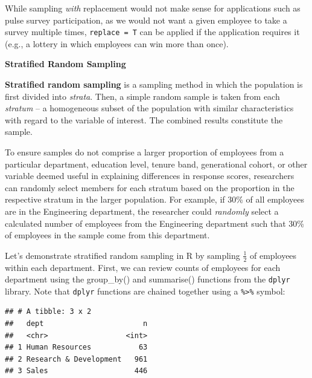 \documentclass[]{book}
\newenvironment{Shaded}{\begin{snugshade}}{\end{snugshade}}
\newcommand{\CommentTok}[1]{\textcolor[rgb]{0.56,0.35,0.01}{\textit{#1}}}
\newcommand{\DataTypeTok}[1]{\textcolor[rgb]{0.13,0.29,0.53}{#1}}
\newcommand{\KeywordTok}[1]{\textcolor[rgb]{0.13,0.29,0.53}{\textbf{#1}}}
\newcommand{\NormalTok}[1]{#1}
\newcommand{\OperatorTok}[1]{\textcolor[rgb]{0.81,0.36,0.00}{\textbf{#1}}}
\begin{document}
While sampling \emph{with} replacement would not make sense for applications such as pulse survey participation, as we would not want a given employee to take a survey multiple times, \texttt{replace\ =\ T} can be applied if the application requires it (e.g., a lottery in which employees can win more than once).

\textbf{Stratified Random Sampling}

\textbf{Stratified random sampling} is a sampling method in which the population is first divided into \emph{strata}. Then, a simple random sample is taken from each \emph{stratum} -- a homogeneous subset of the population with similar characteristics with regard to the variable of interest. The combined results constitute the sample.

To ensure samples do not comprise a larger proportion of employees from a particular department, education level, tenure band, generational cohort, or other variable deemed useful in explaining differences in response scores, researchers can randomly select members for each stratum based on the proportion in the respective stratum in the larger population. For example, if 30\% of all employees are in the Engineering department, the researcher could \emph{randomly} select a calculated number of employees from the Engineering department such that 30\% of employees in the sample come from this department.

Let's demonstrate stratified random sampling in R by sampling \(\frac{1}{2}\) of employees within each department. First, we can review counts of employees for each department using the group\_by() and summarise() functions from the \texttt{dplyr} library. Note that \texttt{dplyr} functions are chained together using a \texttt{\%\textgreater{}\%} symbol:

\begin{Shaded}
\end{Shaded}

\begin{verbatim}
## # A tibble: 3 x 2
##   dept                       n
##   <chr>                  <int>
## 1 Human Resources           63
## 2 Research & Development   961
## 3 Sales                    446
\end{verbatim}
\end{document}
